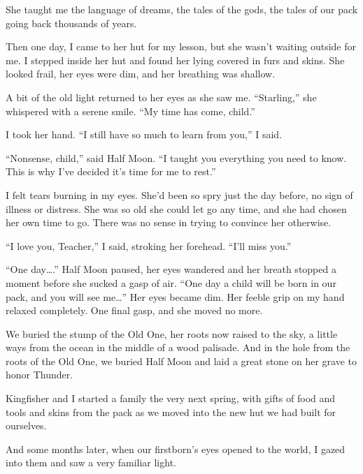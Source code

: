 She taught me the language of dreams, the tales of the gods, the tales of our pack going back thousands of years.

Then one day, I came to her hut for my lesson, but she wasn't waiting outside for me. I stepped inside her hut and found her lying covered in furs and skins. She looked frail, her eyes were dim, and her breathing was shallow.

A bit of the old light returned to her eyes as she saw me. ``Starling,'' she whispered with a serene smile. ``My time has come, child.''

I took her hand. ``I still have so much to learn from you,'' I said.

``Nonsense, child,'' said Half Moon. ``I taught you everything you need to know. This is why I've decided it's time for me to rest.''

I felt tears burning in my eyes. She'd been so spry just the day before, no sign of illness or distress. She was so old she could let go any time, and she had chosen her own time to go. There was no sense in trying to convince her otherwise.

``I love you, Teacher,'' I said, stroking her forehead. ``I'll miss you.''

``One day\ldots.'' Half Moon paused, her eyes wandered and her breath stopped a moment before she sucked a gasp of air. ``One day a child will be born in our pack, and you will see me\ldots'' Her eyes became dim. Her feeble grip on my hand relaxed completely. One final gasp, and she moved no more.

\secdiv

\noindent We buried the stump of the Old One, her roots now raised to the sky, a little ways from the ocean in the middle of a wood palisade. And in the hole from the roots of the Old One, we buried Half Moon and laid a great stone on her grave to honor Thunder.

Kingfisher and I started a family the very next spring, with gifts of food and tools and skins from the pack as we moved into the new hut we had built for ourselves.

And some months later, when our firstborn's eyes opened to the world, I gazed into them and saw a very familiar light.
